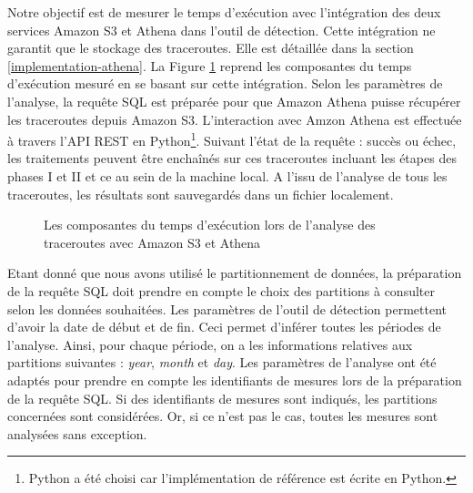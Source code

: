  Notre objectif est de mesurer le temps d'exécution avec  l'intégration des deux services  Amazon S3 et Athena dans l'outil de détection. Cette intégration ne garantit que le stockage des traceroutes. Elle est détaillée dans la section \ref{implementation-athena}. 
La Figure 	\ref{fig:amazonathena} reprend les composantes du temps d'exécution mesuré en se basant sur cette intégration. 
 Selon les paramètres de l'analyse, la requête SQL  est préparée pour que Amazon Athena puisse récupérer les traceroutes depuis Amazon S3. L'interaction avec Amzon Athena est effectuée à travers l'API REST en Python\footnote{Python a été choisi car l'implémentation de référence est écrite en Python.}. Suivant l'état de la requête : succès ou échec, les traitements peuvent être enchaînés sur ces traceroutes incluant les étapes des phases I et II et ce au sein de la machine local. A l'issu de l'analyse de tous les traceroutes, les résultats sont sauvegardés dans un fichier localement.


\begin{figure}[h]
	\centering
	\captionsetup{justification=centering}
	\resizebox{\textwidth}{!}{
		
	}
	\caption{Les composantes du temps d'exécution lors de l'analyse des traceroutes avec Amazon S3 et Athena }
	\label{fig:amazonathena}
\end{figure}






Etant donné que nous avons utilisé le partitionnement de données, la préparation de la requête SQL 
doit prendre en compte le choix des partitions à consulter selon les données souhaitées.
Les paramètres de l'outil de détection permettent d'avoir  la date de début et de fin. Ceci permet d'inférer toutes les périodes de l'analyse. Ainsi, pour chaque période, on a les informations relatives aux partitions suivantes  : \textit{year}, \textit{month} et \textit{day}. Les paramètres de l'analyse ont été adaptés pour prendre en compte les identifiants de mesures lors de la préparation de la requête SQL. Si des identifiants de mesures sont indiqués, les partitions concernées sont considérées. Or, si ce n'est pas le cas, toutes les mesures sont analysées sans exception.

